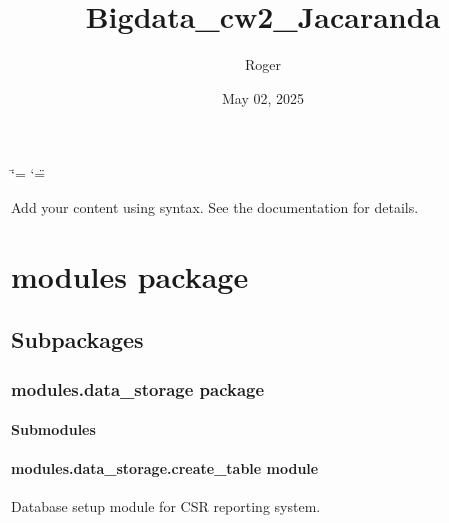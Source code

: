 \documentclass[letterpaper,10pt,english]{sphinxmanual}
\title{Bigdata\_cw2\_Jacaranda}
\date{May 02, 2025}
\author{Roger}
\begin{document}
\ifdefined\shorthandoff
  \ifnum\catcode`\=\string=\active\shorthandoff{=}\fi
  \ifnum\catcode`\"=\active{}\fi
\fi

\pagestyle{empty}
\sphinxmaketitle
\pagestyle{plain}
\sphinxtableofcontents
\pagestyle{normal}
\label{\detokenize{index::doc}}


\sphinxAtStartPar
Add your content using  syntax. See the
documentation for details.

\sphinxstepscope


\chapter{modules package}
\label{\detokenize{modules:modules-package}}\label{\detokenize{modules::doc}}

\section{Subpackages}
\label{\detokenize{modules:subpackages}}
\sphinxstepscope


\subsection{modules.data\_storage package}
\label{\detokenize{modules.data_storage:modules-data-storage-package}}\label{\detokenize{modules.data_storage::doc}}

\subsubsection{Submodules}
\label{\detokenize{modules.data_storage:submodules}}

\subsubsection{modules.data\_storage.create\_table module}
\label{\detokenize{modules.data_storage:module-modules.data_storage.create_table}}\label{\detokenize{modules.data_storage:modules-data-storage-create-table-module}}
\sphinxAtStartPar
Database setup module for CSR reporting system.
\end{document}
